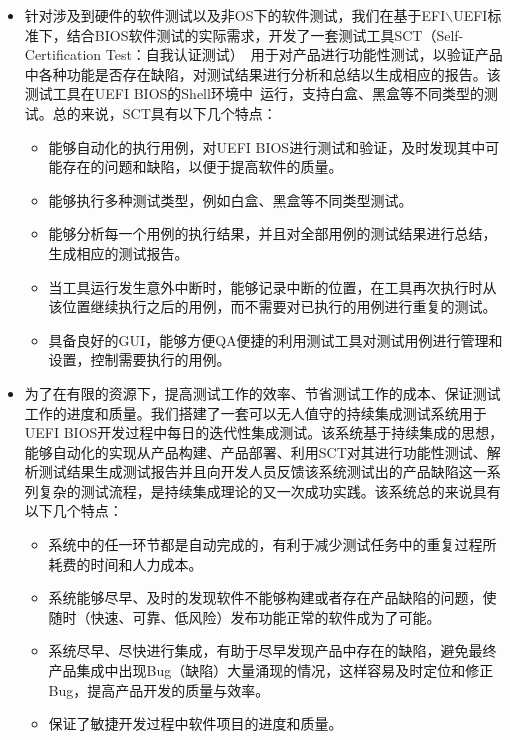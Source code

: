   \begin{itemize}
	\item 针对涉及到硬件的软件测试以及非OS下的软件测试，我们在基于EFI$\backslash$UEFI标准下，结合BIOS软件测试的实际需求，开发了一套测试工具SCT（Self-Certification Test：自我认证测试）~\cite{28, 29}用于对产品进行功能性测试，以验证产品中各种功能是否存在缺陷，对测试结果进行分析和总结以生成相应的报告。该测试工具在UEFI BIOS的Shell环境中~\cite{30, 31}运行，支持白盒、黑盒等不同类型的测试。总的来说，SCT具有以下几个特点：
	  \begin{itemize}
		\item 能够自动化的执行用例，对UEFI BIOS进行测试和验证，及时发现其中可能存在的问题和缺陷，以便于提高软件的质量。
		\item 能够执行多种测试类型，例如白盒、黑盒等不同类型测试。
		\item 能够分析每一个用例的执行结果，并且对全部用例的测试结果进行总结，生成相应的测试报告。
		\item 当工具运行发生意外中断时，能够记录中断的位置，在工具再次执行时从该位置继续执行之后的用例，而不需要对已执行的用例进行重复的测试。
		\item 具备良好的GUI，能够方便QA便捷的利用测试工具对测试用例进行管理和设置，控制需要执行的用例。
	  \end{itemize}
	\item 为了在有限的资源下，提高测试工作的效率、节省测试工作的成本、保证测试工作的进度和质量。我们搭建了一套可以无人值守的持续集成测试系统用于UEFI BIOS开发过程中每日的迭代性集成测试。该系统基于持续集成的思想，能够自动化的实现从产品构建、产品部署、利用SCT对其进行功能性测试、解析测试结果生成测试报告并且向开发人员反馈该系统测试出的产品缺陷这一系列复杂的测试流程，是持续集成理论的又一次成功实践。该系统总的来说具有以下几个特点：
	  \begin{itemize}
		\item 系统中的任一环节都是自动完成的，有利于减少测试任务中的重复过程所耗费的时间和人力成本。
		\item 系统能够尽早、及时的发现软件不能够构建或者存在产品缺陷的问题，使随时（快速、可靠、低风险）发布功能正常的软件成为了可能。
		\item 系统尽早、尽快进行集成，有助于尽早发现产品中存在的缺陷，避免最终产品集成中出现Bug（缺陷）大量涌现的情况，这样容易及时定位和修正Bug，提高产品开发的质量与效率。
		\item 保证了敏捷开发过程中软件项目的进度和质量。
	  \end{itemize}
  \end{itemize}

